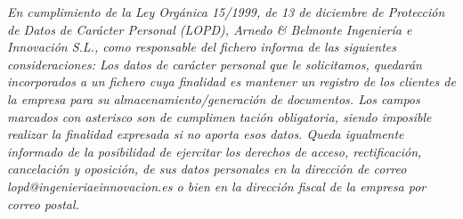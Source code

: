 \textit{En cumplimiento de la Ley Orgánica 15/1999, de 13 de diciembre de
Protección de Datos de Carácter Personal (LOPD), Arnedo \& Belmonte Ingeniería e
Innovación S.L., como responsable del fichero informa de las siguientes
consideraciones: Los datos de carácter personal que le solicitamos, quedarán
incorporados a un fichero cuya finalidad es mantener un registro de los
clientes de la empresa para su almacenamiento/generación de documentos. Los
campos marcados con asterisco son de cumplimen tación obligatoria, siendo
imposible realizar la finalidad expresada si no aporta esos datos. Queda
igualmente informado de la posibilidad de ejercitar los derechos de acceso,
rectificación, cancelación y oposición, de sus datos personales en la dirección
de correo lopd@ingenieriaeinnovacion.es o bien en la dirección fiscal de la
empresa por correo postal.}
